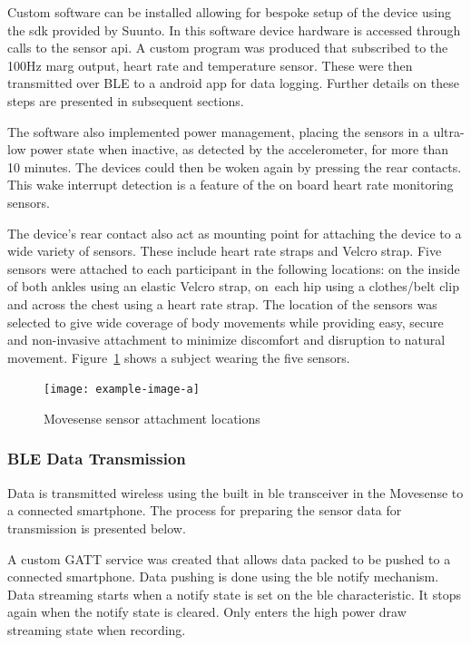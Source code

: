 Custom software can be installed allowing for bespoke setup of the device using the \acrfull{sdk} provided by Suunto. In this software device hardware is accessed through calls to the sensor \acrfull{api}. A custom program was produced that subscribed to the 100Hz \acrshort{marg} output, heart rate and temperature sensor. These were then transmitted over BLE to a android app for data logging. Further details on these steps are presented in subsequent sections.

The software also implemented power management, placing the sensors in a ultra-low power state when inactive, as detected by the accelerometer, for more than 10 minutes. The devices could then be woken again by pressing the rear contacts. This wake interrupt detection is a feature of the on board heart rate monitoring sensors.

The device's rear contact also act as mounting point for attaching the device to a wide variety of sensors. These include heart rate straps and Velcro strap. Five sensors were attached to each participant in the following locations: on the inside of both ankles using an elastic Velcro strap, on~each hip using a clothes/belt clip and across the chest using a heart rate strap. The location of the sensors was selected to give wide coverage of body movements while providing easy, secure and non-invasive attachment to minimize discomfort and disruption to natural movement. Figure~\ref{fig:methods-movesense-sensor-locations} shows a subject wearing the five sensors.

\begin{figure}[!hbt]
    \centering
    \texttt{[image: example-image-a]}
    \caption{Movesense sensor attachment locations}
    \label{fig:methods-movesense-sensor-locations}
\end{figure}

\subsubsection{BLE Data Transmission}
\label{subsection:methods-on-sensor-compression}
Data is transmitted wireless using the built in \acrfull{ble} transceiver in the Movesense to a connected smartphone. The process for preparing the sensor data for transmission is presented below.

A custom GATT service was created that allows data packed to be pushed to a connected smartphone. Data pushing is done using the \acrshort{ble} notify mechanism. Data streaming starts when a notify state is set on the \acrshort{ble} characteristic. It stops again when the notify state is cleared. Only enters the high power draw streaming state when recording.

